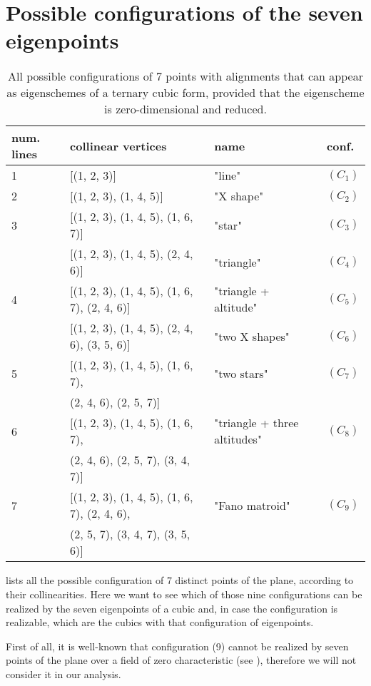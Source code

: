 \documentclass{amsart}
\theoremstyle{plain}
\theoremstyle{definition}
\begin{document}
\section{Possible configurations of the seven eigenpoints}
\label{further_alignments}

\begin{table}
\caption{All possible configurations of $7$ points with alignments that can appear as eigenschemes of a ternary cubic form, provided that the eigenscheme is zero-dimensional and reduced.}
\centering
\begin{tabular}{|llll|}\hline
  num. lines  & collinear vertices & name & conf.\\ \hline
 1& [(1, 2, 3)] & "line" & $(C_1)$\\
 2& [(1, 2, 3), (1, 4, 5)] & "X shape"& $(C_2)$\\
 3& [(1, 2, 3), (1, 4, 5), (1, 6, 7)] & "star" & $(C_3)$\\
  & [(1, 2, 3), (1, 4, 5), (2, 4, 6)] & "triangle" & $(C_4)$\\
 4& [(1, 2, 3), (1, 4, 5), (1, 6, 7), (2, 4, 6)] & "triangle + altitude"
& $(C_5)$\\
  & [(1, 2, 3), (1, 4, 5), (2, 4, 6), (3, 5, 6)] & "two X shapes" & $(C_6)$\\
 5& [(1, 2, 3), (1, 4, 5), (1, 6, 7),  & "two stars" & $(C_7)$\\
  & \phantom{[}(2, 4, 6), (2, 5, 7)] & &\\
 6& [(1, 2, 3), (1, 4, 5), (1, 6, 7), & "triangle + three altitudes" & $(C_8)$\\
  & \phantom{[} (2, 4, 6), (2, 5, 7), (3, 4, 7)] & & \\
 7& [(1, 2, 3),
   (1, 4, 5),
   (1, 6, 7),
   (2, 4, 6), & "Fano matroid" & $(C_9)$\\
  & \phantom{[} (2, 5, 7),
   (3, 4, 7),
   (3, 5, 6)] & & \\ \hline
\end{tabular}
\label{table:all_alignments}
\end{table}

 lists all the possible configuration
of 7 distinct points of the plane, according to their collinearities. Here
we want to see which of those nine configurations can be realized by
the seven eigenpoints of a cubic and, in case the configuration is
realizable, which are the cubics with that configuration of eigenpoints.

First of all, it is well-known that configuration (9) cannot be realized
by seven points of the plane over a field of zero
characteristic (see \cite{Whitney1935}), therefore we will not consider
it in our analysis.
\end{document}
